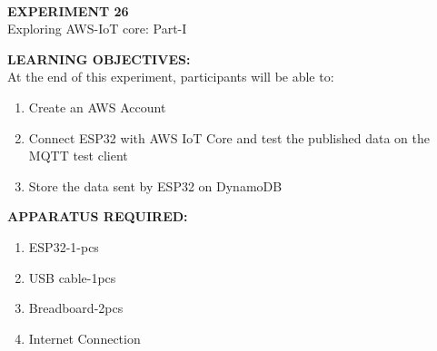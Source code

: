 \documentclass[12pt,a4paper]{article}
\begin{document}
\begin{center}
\textbf{\large \\EXPERIMENT 26 }\\[6pt]
Exploring AWS-IoT core: Part-I
\end{center}

\textbf{\large LEARNING OBJECTIVES:}\\[3pt]
At the end of this experiment, participants will be able to:\vspace{-6mm}\begin{enumerate}
 \setlength\itemsep{-0.3em}
\item Create an AWS Account
\item Connect  ESP32 with AWS IoT Core and  test the published data on the MQTT test client 
\item Store the data sent by ESP32 on DynamoDB 

\end{enumerate}

\textbf{\large APPARATUS REQUIRED:}\\
\vspace{-3mm}
\begin{enumerate}
 \setlength\itemsep{-0.3em}
\item ESP32-1-pcs 
\item USB cable-1pcs
\item Breadboard-2pcs
\item Internet Connection 

\end{enumerate}
\end{document}
